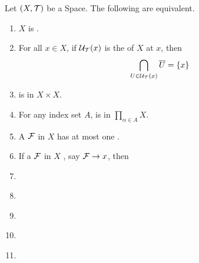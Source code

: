 \begin{prop}
    \label{prop:HausdorffCharacterizations}
    Let $(X,\mathcal{T})$ be a \scT Space. 
    The following are equivalent.
    \begin{enumerate}[label=(\roman*), ref={\ref{prop:HausdorffCharacterizations}~\roman*}]
        \item
        \label{prop:HausdorffCharacterizations:Hausdorff}
        $X$ is \Hausdorff.
        \item
        \label{prop:HausdorffCharacterizations:ClosedNeighborhoodsConvergeToPoint}
        For all $x \in X$, if $\mathcal{U}_{\mathcal{T}}(x)$ is the 
        \NeighborhoodFilter of $X$ at $x$, then 
        \begin{equation*}
        \bigcap\limits_{U \in \mathcal{U}_{\mathcal{T}}(x)} \overline{U} = \{x\}
        \end{equation*}
        \item
        \label{prop:HausdorffCharacterizations:ClosedBinaryDiagonal}
         is \SetClosed in $X \times X$. 
        \item
        \label{prop:HausdorffCharacterizations:ClosedDiagonal}
        For any index set $A$,  is \SetClosed in $\prod\limits_{\alpha \in A} X$.
        \item
        \label{prop:HausdorffCharacterizations:UniqueLimit}
        A \Filter $\mathcal{F}$ in $X$ has at most one \FilterLimit.
        \item
        \label{prop:HausdorffCharacterizations:UniqueClusterPoint}
        If a \Filter $\mathcal{F}$ in $X$ \FilterConverges, say $\mathcal{F} \to x$, then 
        \item
        \label{prop:HausdorffCharacterizations:}
        \item
        \label{prop:HausdorffCharacterizations:}
        \item
        \label{prop:HausdorffCharacterizations:}
        \item
        \label{prop:HausdorffCharacterizations:}
        \item
        \label{prop:HausdorffCharacterizations:}
    \end{enumerate}
\end{prop}
